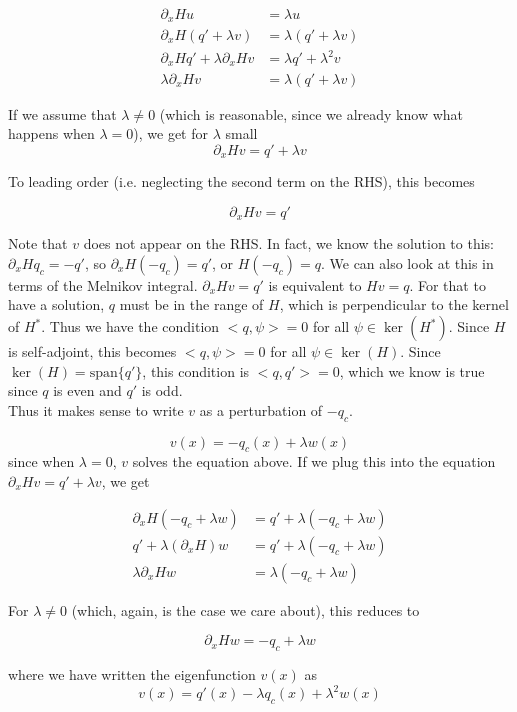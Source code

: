 \documentclass[12pt]{article}
\begin{document}
\begin{align*}
\partial_x H u &= \lambda u \\
\partial_x H (q' + \lambda v) &= \lambda(q' + \lambda v) \\
\partial_x H q' + \lambda \partial_x H v &= \lambda q' + \lambda^2 v \\
\lambda \partial_x H v &= \lambda(q' + \lambda v)
\end{align*}

If we assume that $\lambda \neq 0$ (which is reasonable, since we already know what happens when $\lambda = 0$), we get for $\lambda$ small
\[
\partial_x H v = q' + \lambda v
\]

To leading order (i.e. neglecting the second term on the RHS), this becomes

\[
\partial_x H v = q'
\]

Note that $v$ does not appear on the RHS. In fact, we know the solution to this: $\partial_x H q_c = -q'$, so $\partial_x H (-q_c) = q'$, or $H (-q_c) = q$. We can also look at this in terms of the Melnikov integral. $\partial_x H v = q'$ is equivalent to $Hv = q$. For that to have a solution, $q$ must be in the range of $H$, which is perpendicular to the kernel of $H^*$. Thus we have the condition $<q, \psi> = 0$ for all $\psi \in \ker(H^*)$. Since $H$ is self-adjoint, this becomes $<q, \psi> = 0$ for all $\psi \in \ker(H)$. Since $\ker(H) = \textrm{span} \{q'\}$, this condition is $<q, q'> = 0$, which we know is true since $q$ is even and $q'$ is odd.\\

Thus it makes sense to write $v$ as a perturbation of $-q_c$.

\[
v(x) = -q_c(x) + \lambda w(x)
\]
since when $\lambda = 0$, $v$ solves the equation above. If we plug this into the equation $\partial_x H v = q' + \lambda v$, we get

\begin{align*}
\partial_x H(-q_c + \lambda w) &= q' + \lambda(-q_c + \lambda w) \\
q' + \lambda (\partial_x H) w &= q' + \lambda(-q_c + \lambda w) \\
\lambda \partial_x H w &= \lambda(-q_c + \lambda w)
\end{align*}

For $\lambda \neq 0$ (which, again, is the case we care about), this reduces to

\[
\partial_x H w = -q_c + \lambda w
\]

where we have written the eigenfunction $v(x)$ as
\[
v(x) = q'(x) - \lambda q_c(x) + \lambda^2 w(x)
\]
\end{document}
